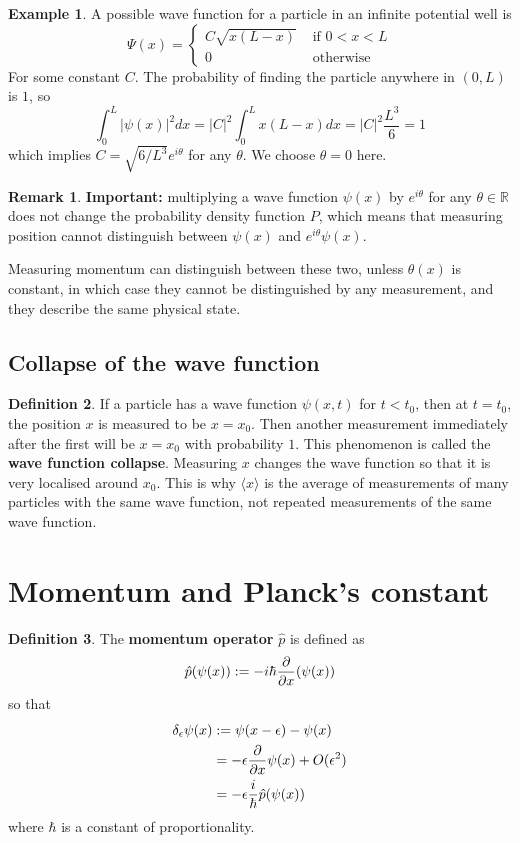 \documentclass[12pt,a4paper]{article}
\theoremstyle{definition}
\newtheorem{definition}{Definition}[subsection]
\newtheorem{example}[definition]{Example}
\newtheorem*{remark}{Remark}
\begin{document}
\begin{example}
	A possible wave function for a particle in an infinite potential well is
	\[
		\Psi(x) = \begin{cases}
			C \sqrt{x(L - x)} & \text{ if } 0 < x < L \\
			0 & \text{ otherwise }
		\end{cases}
	\]
	For some constant $C$. The probability of finding the particle anywhere in $(0, L)$ is $1$, so
	\[
		\int_{0}^{L} |\psi(x)|^2 dx = |C|^2 \int_{0}^{L} x(L - x) dx = |C|^2 \frac{L^3}{6} = 1
	\]
	which implies $C = \sqrt{6 / L^3} e^{i \theta}$ for any $\theta$. We choose $\theta = 0$ here.
\end{example}

\begin{remark}
	\textbf{Important:} multiplying a wave function $\psi(x)$ by $e^{i \theta}$ for any $\theta \in \mathbb{R}$ does not change the probability density function $P$, which means that measuring position cannot distinguish between $\psi(x)$ and $e^{i \theta} \psi(x)$.
	
	Measuring momentum can distinguish between these two, unless $\theta(x)$ is constant, in which case they cannot be distinguished by any measurement, and they describe the same physical state.
\end{remark}

\subsection{Collapse of the wave function}

\begin{definition}
	If a particle has a wave function $\psi(x, t)$ for $t < t_0$, then at $t = t_0$, the position $x$ is measured to be $x = x_0$. Then another measurement immediately after the first will be $x = x_0$ with probability $1$. This phenomenon is called the \textbf{wave function collapse}. Measuring $x$ changes the wave function so that it is very localised around $x_0$. This is why $\langle x \rangle$ is the average of measurements of many particles with the same wave function, not repeated measurements of the same wave function.
\end{definition}

\section{Momentum and Planck's constant}

\begin{definition}
	The \textbf{momentum operator} $\hat{p}$ is defined as
	\[
		\hat{p} (\psi(x)) := -i \hbar \diffp{}{x} (\psi(x))
	\]
	so that
	\[
		\begin{aligned}
			\delta_{\epsilon} \psi(x)
				& := \psi(x - \epsilon) - \psi(x) \\
				& = -\epsilon \diffp{}{x} \psi(x) + O(\epsilon^2) \\
				& = -\epsilon \frac{i}{\hbar} \hat{p} (\psi(x))
		\end{aligned}
	\]
	where $\hbar$ is a constant of proportionality.
\end{definition}
\end{document}
